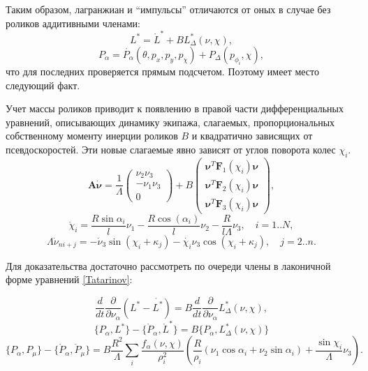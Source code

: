 Таким образом, лагранжиан и ``импульсы'' отличаются от оных в случае без роликов аддитивными членами:
$$ L^{*} = \mathring{L}^{*} + BL^{*}_\Delta(\nu, \chi),$$
$$ P_\alpha = \mathring{P_\alpha}(\theta, p_x, p_y, p_\chi) + P_\Delta(p_{\phi_i}, \chi),$$
что для последних проверяется прямым подсчетом. Поэтому имеет место следующий факт.

\begin{stmt}
    Учет массы роликов приводит к появлению в правой части дифференциальных уравнений, описывающих динамику экипажа, слагаемых, пропорциональных собственному моменту инерции роликов $B$ и квадратично зависящих от псевдоскоростей. Эти новые слагаемые явно зависят от углов поворота колес $\chi_i$.
    $$\boldsymbol{A}\dot{\boldsymbol{\nu}} = \frac1\Lambda
    \left(
    \begin{array}{c}
         \nu_2\nu_3  \\
         -\nu_1\nu_3 \\
         0
    \end{array}
    \right) + B
     \left(
    \begin{array}{c}
         \boldsymbol{\nu}^T\boldsymbol{F}_1(\chi_i)\boldsymbol{\nu}  \\
         \boldsymbol{\nu}^T\boldsymbol{F}_2(\chi_i)\boldsymbol{\nu} \\
         \boldsymbol{\nu}^T\boldsymbol{F}_3(\chi_i)\boldsymbol{\nu}
    \end{array}
    \right),
    $$
    $$
    \dot{\chi}_i = \frac{R\sin\alpha_i}{l}\nu_1 - \frac{R\cos(\alpha_i)}{l}\nu_2 - \frac{R}{l\Lambda}\nu_3, \quad i = 1..N,
    $$
    $$
    \Lambda\dot{\nu}_{ni+j} = -\dot{\nu}_3\sin(\chi_i+\kappa_j) - \dot{\chi_i}\nu_3\cos(\chi_i+\kappa_j), \quad j = 2..n.
    $$
\end{stmt}

Для доказательства достаточно рассмотреть по очереди члены в лаконичной форме уравнений \ref{Tatarinov}:

$$ \frac{d}{dt}\frac{\partial }{\partial \nu_\alpha}(L^{*} - \mathring{L^{*}}) = B\frac{d}{dt}\frac{\partial}{\partial \nu_\alpha}L^{*}_\Delta(\nu, \chi), $$
$$ \{P_\alpha, L^{*}\} - \{\mathring{P}_\alpha, \mathring{L}^{*}\} = B\{ P_\alpha, L^{*}_\Delta(\nu, \chi) \} $$
$$\{P_\alpha, P_\mu\} - \{\mathring{P}_\alpha, \mathring{P}_\mu\} = B\frac{R^2}{\Lambda}\sum_i\frac{f_\alpha(\nu, \chi)}{\rho^2_i}(\frac{R}{\rho_i}(\nu_1\cos\alpha_i + \nu_2\sin\alpha_i) + \frac{\sin\chi_i}{\Lambda}\nu_3).$$
